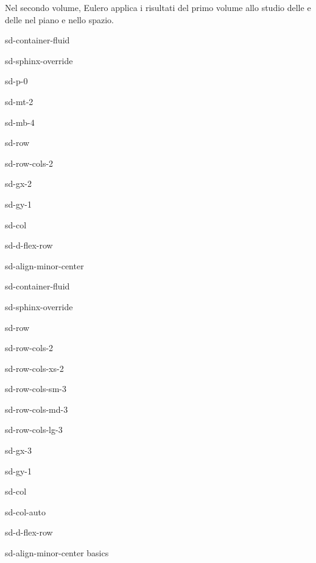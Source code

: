 \documentclass[letterpaper,10pt,english]{jupyterBook}
\begin{document}
\sphinxAtStartPar
Nel secondo volume, Eulero applica i risultati del primo volume allo studio delle  e delle  nel piano e nello spazio.

\sphinxstepscope

\begin{sphinxuseclass}{sd-container-fluid}
\begin{sphinxuseclass}{sd-sphinx-override}
\begin{sphinxuseclass}{sd-p-0}
\begin{sphinxuseclass}{sd-mt-2}
\begin{sphinxuseclass}{sd-mb-4}
\begin{sphinxuseclass}{sd-row}
\begin{sphinxuseclass}{sd-row-cols-2}
\begin{sphinxuseclass}{sd-gx-2}
\begin{sphinxuseclass}{sd-gy-1}
\begin{sphinxuseclass}{sd-col}
\begin{sphinxuseclass}{sd-d-flex-row}
\begin{sphinxuseclass}{sd-align-minor-center}
\begin{sphinxuseclass}{sd-container-fluid}
\begin{sphinxuseclass}{sd-sphinx-override}
\begin{sphinxuseclass}{sd-row}
\begin{sphinxuseclass}{sd-row-cols-2}
\begin{sphinxuseclass}{sd-row-cols-xs-2}
\begin{sphinxuseclass}{sd-row-cols-sm-3}
\begin{sphinxuseclass}{sd-row-cols-md-3}
\begin{sphinxuseclass}{sd-row-cols-lg-3}
\begin{sphinxuseclass}{sd-gx-3}
\begin{sphinxuseclass}{sd-gy-1}
\begin{sphinxuseclass}{sd-col}
\begin{sphinxuseclass}{sd-col-auto}
\begin{sphinxuseclass}{sd-d-flex-row}
\begin{sphinxuseclass}{sd-align-minor-center}
\sphinxAtStartPar
basics


\end{sphinxuseclass}
\end{sphinxuseclass}
\end{sphinxuseclass}
\end{sphinxuseclass}
\end{sphinxuseclass}
\end{sphinxuseclass}
\end{sphinxuseclass}
\end{sphinxuseclass}
\end{sphinxuseclass}
\end{sphinxuseclass}
\end{sphinxuseclass}
\end{sphinxuseclass}
\end{sphinxuseclass}
\end{sphinxuseclass}
\end{sphinxuseclass}
\end{sphinxuseclass}
\end{sphinxuseclass}
\end{sphinxuseclass}
\end{sphinxuseclass}
\end{sphinxuseclass}
\end{sphinxuseclass}
\end{sphinxuseclass}
\end{sphinxuseclass}
\end{sphinxuseclass}
\end{sphinxuseclass}
\end{sphinxuseclass}
\end{document}
